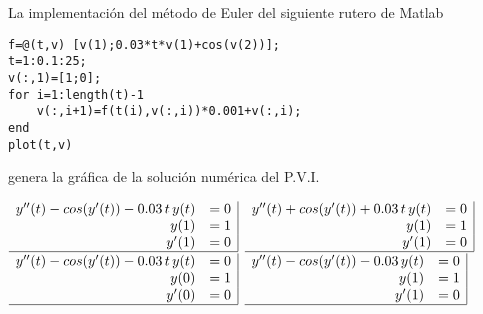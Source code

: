 \begin{pregunta}
\begin{cuerpo}
La implementaci\'on del m\'etodo de Euler del siguiente rutero de Matlab 
\begin{lstlisting}
f=@(t,v) [v(1);0.03*t*v(1)+cos(v(2))];
t=1:0.1:25;
v(:,1)=[1;0];
for i=1:length(t)-1
    v(:,i+1)=f(t(i),v(:,i))*0.001+v(:,i);
end
plot(t,v)
\end{lstlisting}
genera la gr\'afica de la soluci\'on num\'erica del P.V.I. 
\end{cuerpo}

\begin{multicols}{2}
\begin{alternativas}
{$\begin{array}{rl|}
y''(t)-cos(y'(t))-0.03\,t\,y(t)	&=0\\
y(1)	&=1\\
y'(1)	&=0\\ \hline
\end{array}$}
{$\begin{array}{rl|}
y''(t)+cos(y'(t))+0.03\,t\,y(t)	&=0\\
y(1)	&=1\\
y'(1)	&=0\\ \hline
\end{array}$}
{$\begin{array}{rl|}
y''(t)-cos(y'(t))-0.03\,t\,y(t)	&=0\\
y(0)	&=1\\
y'(0)	&=0\\ \hline
\end{array}$}
{$\begin{array}{rl|}
y''(t)-cos(y'(t))-0.03\,y(t)	&=0\\
y(1)	&=1\\
y'(1)	&=0\\ \hline
\end{array}$}
\end{alternativas}
\end{multicols}
\justificacion{8cm}
\end{pregunta}